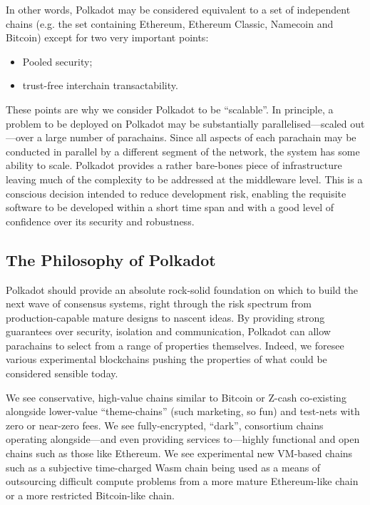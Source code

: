 \documentclass[9pt,oneside]{amsart}
\makeatletter
\providecommand{\tightlist}{%
  \setlength{\itemsep}{0pt}\setlength{\parskip}{0pt}}
\newcommand*\eg{e.g.\@\xspace}
\makeatother
\begin{document}
\begin{multicols}{2}
 In other words, Polkadot may be considered equivalent to a set of independent chains (\eg the set containing Ethereum, Ethereum Classic, Namecoin and Bitcoin) except for two very important points:

\begin{itemize}
\tightlist
\item Pooled security;
\item trust-free interchain transactability.
\end{itemize}

 These points are why we consider Polkadot to be ``scalable''. In principle, a problem to be deployed on Polkadot may be substantially parallelised---scaled out---over a large number of parachains. Since all aspects of each parachain may be conducted in parallel by a different segment of the network, the system has some ability to scale. Polkadot provides a rather bare-bones piece of infrastructure leaving much of the complexity to be addressed at the middleware level. This is a conscious decision intended to reduce development risk, enabling the requisite software to be developed within a short time span and with a good level of confidence over its security and robustness.

\subsection{The Philosophy of Polkadot}\label{the-philosophy-of-disparity}

 Polkadot should provide an absolute rock-solid foundation on which to build the next wave of consensus systems, right through the risk spectrum from production-capable mature designs to nascent ideas. By providing strong guarantees over security, isolation and communication, Polkadot can allow parachains to select from a range of properties themselves. Indeed, we foresee various experimental blockchains pushing the properties of what could be considered sensible today.

We see conservative, high-value chains similar to Bitcoin or Z-cash\cite{sasson2014zerocash}
 co-existing alongside lower-value ``theme-chains'' (such marketing, so fun) and test-nets with zero or near-zero fees. We see fully-encrypted, ``dark'', consortium chains operating alongside---and even providing services to---highly functional and open chains such as those like Ethereum. We see experimental new VM-based chains such as a subjective time-charged Wasm chain being used as a means of outsourcing difficult compute problems from a more mature Ethereum-like chain or a more restricted Bitcoin-like chain.


\end{multicols}
\end{document}
